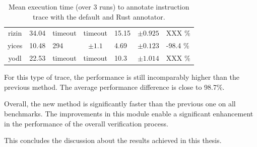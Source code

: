 \begin{table}[h]
{\begin{tabular}{ccgcgcg}
            rizin                                & 34.04                                & timeout                                   & timeout                                & 15.15                     & $ \pm 0.925 $ & XXX \%    \\
            yices                                & 10.48                                & 294                                       & $ \pm 1.1 $                            & 4.69                      & $ \pm 0.123 $ & -98.4 \%  \\
            yodl                                 & 22.53                                & timeout                                   & timeout                                & 10.3                      & $ \pm 1.014 $ & XXX \%    \\
            \bottomrule
        \end{tabular}
    }
    \caption{Mean execution time (over 3 runs) to annotate instruction trace with the default and Rust annotator.}
    \label{table:annotate-instruction-trace-3}
\end{table}

For this type of trace, the performance is still incomparably higher than the previous method. The average performance difference is close to 98.7\%.

Overall, the new method is significantly faster than the previous one on all benchmarks. The improvements in this module enable a significant enhancement in the performance of the overall verification process.

This concludes the discussion about the results achieved in this thesis.
